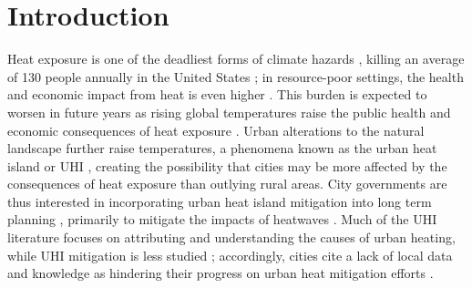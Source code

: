 \documentclass[draft,linenumbers]{agujournal}
\begin{document}

%
% 
% 
% 


\section{Introduction}\label{sec:intro}
Heat exposure is one of the deadliest forms of climate hazards \cite{wmo}, killing an average of 130 people annually in the United States \citep{usnh_stat}; in resource-poor settings, the health and economic impact from heat is even higher \citep{wmo}. This burden is expected to worsen in future years as rising global temperatures raise the public health and economic consequences of heat exposure \citep{ipcc}. 
Urban alterations to the natural landscape further raise temperatures, a phenomena known as the urban heat island or UHI \citep{oke82}, creating the possibility that cities may be more affected by the consequences of heat exposure than outlying rural areas.
City governments are thus interested in incorporating urban heat island mitigation into long term planning \citep{shickman2016current}, primarily to mitigate the impacts of heatwaves \citep{hewitt2014cool}. Much of the UHI literature focuses on attributing and understanding the causes of urban heating, while UHI mitigation is less studied \citep{huang2018urban}; accordingly, cities cite a lack of local data and knowledge as hindering their progress on urban heat mitigation efforts \citep{hewitt2014cool}. %
 
\end{document}
